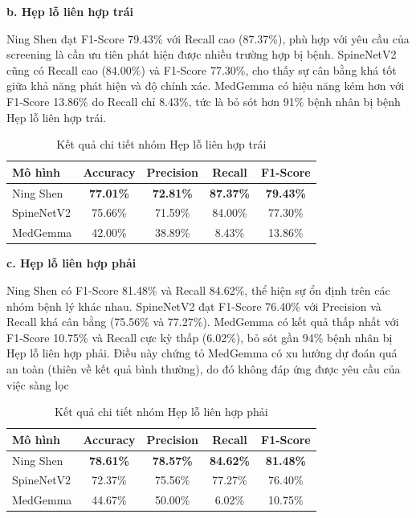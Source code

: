 \textbf{b. Hẹp lỗ liên hợp trái}

Ning Shen đạt F1-Score 79.43\% với Recall cao (87.37\%), phù hợp với yêu cầu của screening là cần ưu tiên phát hiện được nhiều trường hợp bị bệnh. SpineNetV2 cũng có Recall cao (84.00\%) và F1-Score 77.30\%, cho thấy sự cân bằng khá tốt giữa khả năng phát hiện và độ chính xác. MedGemma có hiệu năng kém hơn với F1-Score 13.86\% do Recall chỉ 8.43\%, tức là bỏ sót hơn 91\% bệnh nhân bị bệnh Hẹp lỗ liên hợp trái.

\begin{table}[H]
    \centering
    \caption{Kết quả chi tiết nhóm Hẹp lỗ liên hợp trái}
    \label{tab:nfn_left_metrics}
    \renewcommand{\arraystretch}{1.2}
    \begin{tabular}{lcccc}
        \toprule
        \textbf{Mô hình} & \textbf{Accuracy} & \textbf{Precision} & \textbf{Recall} & \textbf{F1-Score} \\
        \midrule
        Ning Shen & \textbf{77.01\%} & \textbf{72.81\%} & \textbf{87.37\%} & \textbf{79.43\%} \\
        SpineNetV2 & 75.66\% & 71.59\% & 84.00\% & 77.30\% \\
        MedGemma & 42.00\% & 38.89\% & 8.43\% & 13.86\% \\
        \bottomrule
    \end{tabular}
\end{table}

\newpage

\textbf{c. Hẹp lỗ liên hợp phải}

Ning Shen có F1-Score 81.48\% và Recall 84.62\%, thể hiện sự ổn định trên các nhóm bệnh lý khác nhau. SpineNetV2 đạt F1-Score 76.40\% với Precision và Recall khá cân bằng (75.56\% và 77.27\%). MedGemma có kết quả thấp nhất với F1-Score 10.75\% và Recall cực kỳ thấp (6.02\%), bỏ sót gần 94\% bệnh nhân bị Hẹp lỗ liên hợp phải. Điều này chứng tỏ MedGemma có xu hướng dự đoán quá an toàn (thiên về kết quả bình thường), do đó không đáp ứng được yêu cầu của việc sàng lọc

\begin{table}[H]
    \centering
    \caption{Kết quả chi tiết nhóm Hẹp lỗ liên hợp phải}
    \label{tab:nfn_right_metrics}
    \renewcommand{\arraystretch}{1.2}
    \begin{tabular}{lcccc}
        \toprule
        \textbf{Mô hình} & \textbf{Accuracy} & \textbf{Precision} & \textbf{Recall} & \textbf{F1-Score} \\
        \midrule
        Ning Shen & \textbf{78.61\%} & \textbf{78.57\%} & \textbf{84.62\%} & \textbf{81.48\%} \\
        SpineNetV2 & 72.37\% & 75.56\% & 77.27\% & 76.40\% \\
        MedGemma & 44.67\% & 50.00\% & 6.02\% & 10.75\% \\
        \bottomrule
    \end{tabular}
\end{table}

